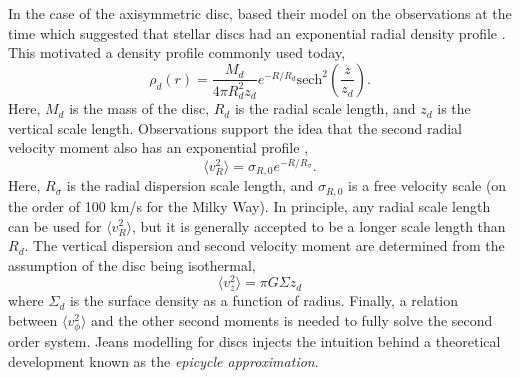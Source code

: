 In the case of the axisymmetric disc, \citet{hernquist_1993} based their model on the observations at the time which suggested that stellar discs had an exponential radial density profile \citep{freeman_1970}. This motivated a density profile commonly used today,
\begin{equation}
\rho_d(r) = \frac{M_d}{4 \pi R_d^2 z_d} e^{-R/R_d} \text{sech}^2\left(\frac{z}{z_d} \right). 
\end{equation}
Here, $M_d$ is the mass of the disc, $R_d$ is the radial scale length, and $z_d$ is the vertical scale length.
Observations support the idea that the second radial velocity moment also has an exponential profile \citep{van_der_kruit_searle_1981, lewis_freeman_1989},
\begin{equation}
\langle v_R^2 \rangle = \sigma_{R,0} e^{-R/R_\sigma}.
\end{equation}
Here, $R_\sigma$ is the radial dispersion scale length, and $\sigma_{R,0}$ is a free velocity scale (on the order of 100 km/s for the Milky Way). In  principle, any radial scale length can be used for $\langle v_R^2 \rangle$, but it is generally accepted to be a longer scale length than $R_d$. The vertical dispersion and second velocity moment are determined from the assumption of the disc being isothermal,
\begin{equation}
\langle v_z^2 \rangle = \pi G \Sigma z_d
\end{equation}
where $\Sigma_d$ is the surface density as a function of radius. Finally, a relation between $\langle v_\phi^2 \rangle$ and the other second moments is needed to fully solve the second order system. Jeans modelling for discs injects the intuition behind a theoretical development known as the \textit{epicycle approximation}. 

